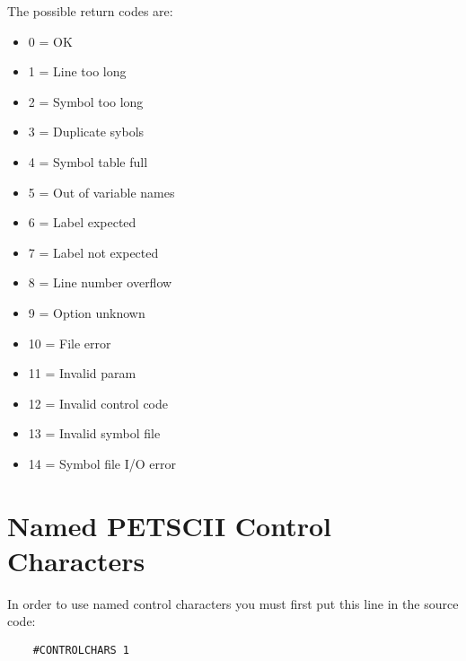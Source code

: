 \documentclass{article}
\begin{document}
        The possible return codes are:

        \begin{itemize}
            \item 0 = OK
            \item 1 = Line too long
            \item 2 = Symbol too long
            \item 3 = Duplicate sybols
            \item 4 = Symbol table full
            \item 5 = Out of variable names
            \item 6 = Label expected
            \item 7 = Label not expected
            \item 8 = Line number overflow
            \item 9 = Option unknown
            \item 10 = File error
            \item 11 = Invalid param
            \item 12 = Invalid control code
            \item 13 = Invalid symbol file
            \item 14 = Symbol file I/O error
        \end{itemize}

\appendix
\newpage
\section{Named PETSCII Control Characters}
    
    In order to use named control characters you must first
    put this line in the source code:

    \begin{verbatim}
    #CONTROLCHARS 1
    \end{verbatim}
\end{document}
